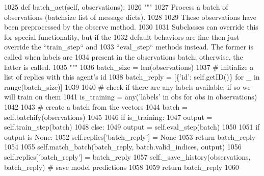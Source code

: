 \begin{DoxyCode}
1025     \textcolor{keyword}{def }batch\_act(self, observations):
1026         \textcolor{stringliteral}{"""}
1027 \textcolor{stringliteral}{        Process a batch of observations (batchsize list of message dicts).}
1028 \textcolor{stringliteral}{}
1029 \textcolor{stringliteral}{        These observations have been preprocessed by the observe method.}
1030 \textcolor{stringliteral}{}
1031 \textcolor{stringliteral}{        Subclasses can override this for special functionality, but if the}
1032 \textcolor{stringliteral}{        default behaviors are fine then just override the ``train\_step`` and}
1033 \textcolor{stringliteral}{        ``eval\_step`` methods instead. The former is called when labels are}
1034 \textcolor{stringliteral}{        present in the observations batch; otherwise, the latter is called.}
1035 \textcolor{stringliteral}{        """}
1036         batch\_size = len(observations)
1037         \textcolor{comment}{# initialize a list of replies with this agent's id}
1038         batch\_reply = [\{\textcolor{stringliteral}{'id'}: self.getID()\} \textcolor{keywordflow}{for} \_ \textcolor{keywordflow}{in} range(batch\_size)]
1039 
1040         \textcolor{comment}{# check if there are any labels available, if so we will train on them}
1041         is\_training = any(\textcolor{stringliteral}{'labels'} \textcolor{keywordflow}{in} obs \textcolor{keywordflow}{for} obs \textcolor{keywordflow}{in} observations)
1042 
1043         \textcolor{comment}{# create a batch from the vectors}
1044         batch = self.batchify(observations)
1045 
1046         \textcolor{keywordflow}{if} is\_training:
1047             output = self.train\_step(batch)
1048         \textcolor{keywordflow}{else}:
1049             output = self.eval\_step(batch)
1050 
1051         \textcolor{keywordflow}{if} output \textcolor{keywordflow}{is} \textcolor{keywordtype}{None}:
1052             self.replies[\textcolor{stringliteral}{'batch\_reply'}] = \textcolor{keywordtype}{None}
1053             \textcolor{keywordflow}{return} batch\_reply
1054 
1055         self.match\_batch(batch\_reply, batch.valid\_indices, output)
1056         self.replies[\textcolor{stringliteral}{'batch\_reply'}] = batch\_reply
1057         self.\_save\_history(observations, batch\_reply)  \textcolor{comment}{# save model predictions}
1058 
1059         \textcolor{keywordflow}{return} batch\_reply
1060 
\end{DoxyCode}
\mbox{\label{classparlai_1_1agents_1_1legacy__agents_1_1seq2seq_1_1torch__agent__v1_1_1TorchAgent_ab8b2fa26aabfd9d7e7abb0abbcfe8044}} 
